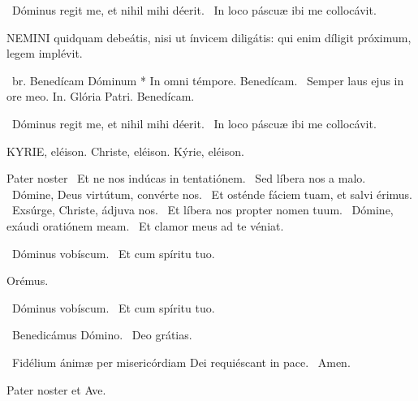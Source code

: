 \V\ Dóminus regit me, et nihil mihi déerit. \R\ In loco páscuæ ibi me collocávit.




\lettrine[lines=2]{N}{EMINI} quidquam debeátis, nisi ut ínvicem diligátis: qui enim díligit próximum, legem implévit.

\R\ br. Benedícam Dóminum * In omni témpore. Benedícam. \V\ Semper laus ejus in ore meo. In. Glória Patri. Benedícam.

\V\ Dóminus regit me, et nihil mihi déerit. \R\ In loco páscuæ ibi me collocávit.



KYRIE, eléison. Christe, eléison. Kýrie, eléison.

Pater noster  \V\ Et ne nos indúcas in tentatiónem. \R\ Sed líbera nos a malo. \V\ Dómine, Deus virtútum, convérte nos. \R\ Et osténde fáciem tuam, et salvi érimus. \V\ Exsúrge, Christe, ádjuva nos. \R\ Et líbera nos propter nomen tuum. \V\ Dómine, exáudi oratiónem meam. \R\ Et clamor meus ad te véniat.


\V\ Dóminus vobíscum. \R\ Et cum spíritu tuo.

Orémus.



\V\ Dóminus vobíscum. \R\ Et cum spíritu tuo.

\V\ Benedicámus Dómino. \R\ Deo grátias.

\V\ Fidélium ánimæ per misericórdiam Dei requiéscant in pace. \R\ Amen.



Pater noster et Ave.

